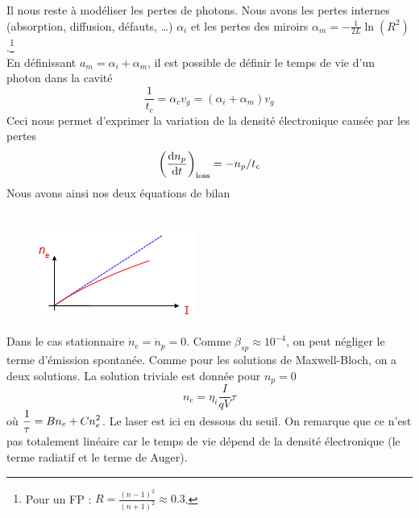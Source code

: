 	Il nous reste à modéliser les pertes de photons. Nous avons les pertes internes (absorption, 
	diffusion, défauts, \dots) $\alpha_i$ et les pertes des miroirs ${\alpha _m} =  - \frac{1}{{2L}}
	\ln ({R^2})$.\footnote{Pour un FP : $R = \frac{{{{(n - 1)}^2}}}{{{{(n + 1)}^2}}} \approx 0.3$.}\\
	
	En définissant $a_m = \alpha_i+\alpha_m$, il est possible de définir le temps de vie d'un photon
	dans la cavité
	\begin{equation}
	\frac{1}{{{t_c}}} = {\alpha _c}{v_g} = ({\alpha _i} + {\alpha _m}){v_g}
	\end{equation}
	Ceci nous permet d'exprimer la variation de la densité électronique causée par les pertes
	\begin{equation}
	{\left(\frac{{{\rm{d}}{n_p}}}{{{\rm{d}}t}}\right)_{{\rm{loss}}}} =  - {n_p}/{t_c}
	\end{equation}
	Nous avons ainsi nos deux équations de bilan\\
	
	\ \\
	
	\begin{figure}
	\vspace{-8mm}
	\includegraphics[scale=0.85]{ch5/image48}
	\end{figure}		
	Dans le cas stationnaire ${\dot n_e} = {\dot n_p} = 0$. Comme $\beta_{sp} \approx 10^{-4}$, on 
	peut négliger le terme d'émission spontanée. Comme pour les solutions de Maxwell-Bloch, on a 
	deux solutions. La solution triviale est donnée pour $n_p=0$
	\begin{equation}
	{n_e} = {\eta _i}\frac{{I}}{{qV}}\tau 
	\end{equation}
	où $\displaystyle \frac{1}{\tau } = B{n_e} + Cn_e^2$. Le laser est ici en dessous du seuil. On remarque 
	que ce n'est pas totalement linéaire car le temps de vie dépend de la densité électronique (le 
	terme radiatif et le terme de Auger).\\
	
